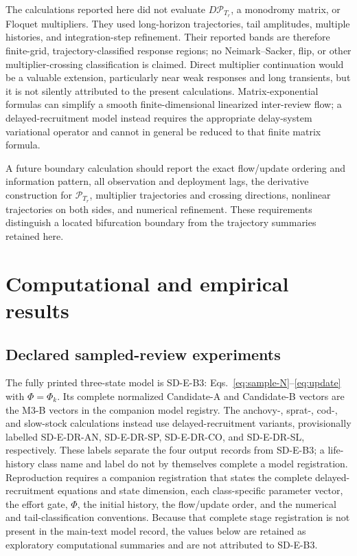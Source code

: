 \documentclass[11pt]{article}
\begin{document}
The calculations reported here did not evaluate $D\mathcal P_{T_r}$, a monodromy matrix, or Floquet multipliers. They used long-horizon trajectories, tail amplitudes, multiple histories, and integration-step refinement. Their reported bands are therefore finite-grid, trajectory-classified response regions; no Neimark--Sacker, flip, or other multiplier-crossing classification is claimed. Direct multiplier continuation would be a valuable extension, particularly near weak responses and long transients, but it is not silently attributed to the present calculations. Matrix-exponential formulas can simplify a smooth finite-dimensional linearized inter-review flow; a delayed-recruitment model instead requires the appropriate delay-system variational operator and cannot in general be reduced to that finite matrix formula.

A future boundary calculation should report the exact flow/update ordering and information pattern, all observation and deployment lags, the derivative construction for $\mathcal P_{T_r}$, multiplier trajectories and crossing directions, nonlinear trajectories on both sides, and numerical refinement. These requirements distinguish a located bifurcation boundary from the trajectory summaries retained here.

\section{Computational and empirical results}

\subsection{Declared sampled-review experiments}

The fully printed three-state model is SD-E-B3: Eqs.~\eqref{eq:sample-N}--\eqref{eq:update} with $\Phi=\Phi_k$. Its complete normalized Candidate-A and Candidate-B vectors are the M3-B vectors in the companion model registry. The anchovy-, sprat-, cod-, and slow-stock calculations instead use delayed-recruitment variants, provisionally labelled SD-E-DR-AN, SD-E-DR-SP, SD-E-DR-CO, and SD-E-DR-SL, respectively. These labels separate the four output records from SD-E-B3; a life-history class name and label do not by themselves complete a model registration. Reproduction requires a companion registration that states the complete delayed-recruitment equations and state dimension, each class-specific parameter vector, the effort gate, $\Phi$, the initial history, the flow/update order, and the numerical and tail-classification conventions. Because that complete stage registration is not present in the main-text model record, the values below are retained as exploratory computational summaries and are not attributed to SD-E-B3.
\end{document}
